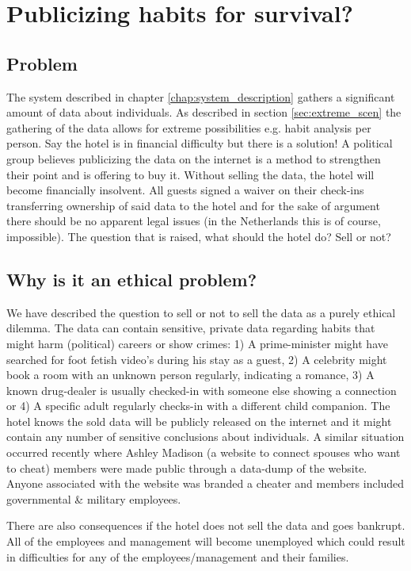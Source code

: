 \chapter{Publicizing habits for survival?}

\section{Problem}
The system described in chapter \ref{chap:system_description} gathers a significant amount of data about individuals. As described in section \ref{sec:extreme_scen} the gathering of the data allows for extreme possibilities e.g. habit analysis per person. Say the hotel is in financial difficulty but there is a solution! A political group believes publicizing the data on the internet is a method to strengthen their point and is offering to buy it. Without selling the data, the hotel will become financially insolvent. All guests signed a waiver on their check-ins transferring ownership of said data to the hotel and for the sake of argument there should be no apparent legal issues (in the Netherlands this is of course, impossible). The question that is raised, what should the hotel do? Sell or not?


\section{Why is it an ethical problem?}
We have described the question to sell or not to sell the data as a purely ethical dilemma. The data can contain sensitive, private data regarding habits that might harm (political) careers or show crimes: 1) A prime-minister might have searched for foot fetish video's during his stay as a guest, 2) A celebrity might book a room with an unknown person regularly, indicating a romance, 3) A known drug-dealer is usually checked-in with someone else showing a connection or 4) A specific adult regularly checks-in with a different child companion. The hotel knows the sold data will be publicly released on the internet and it might contain any number of sensitive conclusions about individuals. A similar situation occurred recently where Ashley Madison (a website to connect spouses who want to cheat) members were made public through a data-dump of the website. Anyone associated with the website was branded a cheater and members included governmental \& military employees.

There are also consequences if the hotel does not sell the data and goes bankrupt. All of the employees and management will become unemployed which could result in difficulties for any of the employees/management and their families. 

